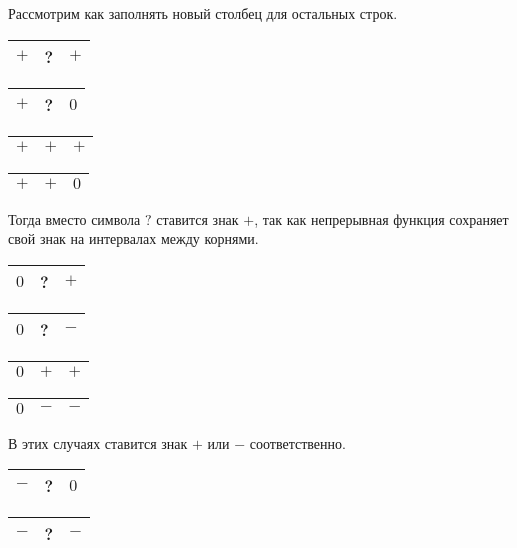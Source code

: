 Рассмотрим как заполнять новый столбец для остальных строк.
\begin{center}
    \begin{tabular}{|c|c|c|}
        \hline
        $+$ & ? & $+$\\
        \hline
    \end{tabular}
        \quad
    \begin{tabular}{|c|c|c|}
        \hline
        $+$ & ? & $0$\\
        \hline
    \end{tabular}           
\end{center}
\begin{center}
    \begin{tabular}{|c|c|c|}
        \hline
        $+$ & $+$ & $+$\\
        \hline
    \end{tabular}
        \quad
    \begin{tabular}{|c|c|c|}
        \hline
        $+$ & $+$ & $0$\\
        \hline
    \end{tabular}           
\end{center}
Тогда вместо символа $?$ ставится знак $+$, так как непрерывная функция сохраняет свой знак на интервалах между корнями.
\begin{center}
    \begin{tabular}{|c|c|c|}
        \hline
        $0$ & ? & $+$\\
        \hline
    \end{tabular}
        \quad
    \begin{tabular}{|c|c|c|}
        \hline
        $0$ & ? & $-$\\
        \hline
    \end{tabular}           
\end{center}
\begin{center}
    \begin{tabular}{|c|c|c|}
        \hline
        $0$ & $+$ & $+$\\
        \hline
    \end{tabular}
        \quad
    \begin{tabular}{|c|c|c|}
        \hline
        $0$ & $-$ & $-$\\
        \hline
    \end{tabular}           
\end{center}
В этих случаях ставится знак $+$ или $-$ соответственно.
\begin{center}
    \begin{tabular}{|c|c|c|}
        \hline
        $-$ & ? & $0$\\
        \hline
    \end{tabular}
        \quad
    \begin{tabular}{|c|c|c|}
        \hline
        $-$ & ? & $-$\\
        \hline
    \end{tabular}           
\end{center}
